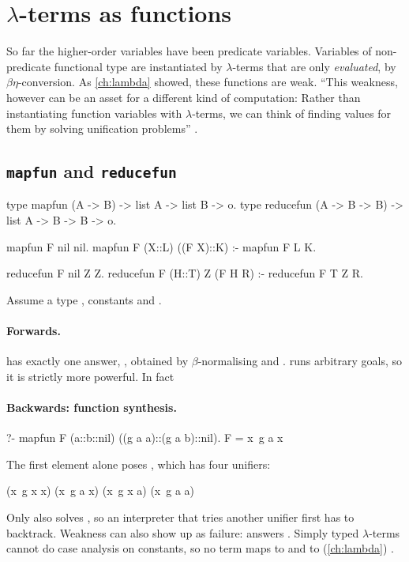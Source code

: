\section{\texorpdfstring{$\lambda$}{Lambda}-terms as functions}\label{sec:hoprog-functions}

So far the higher-order variables have been predicate variables. Variables of non-predicate functional
type are instantiated by $\lambda$-terms that are only \emph{evaluated}, by $\beta\eta$-conversion. As
\cref{ch:lambda} showed, these functions are weak. ``This weakness, however can be an asset for a
different kind of computation: Rather than instantiating function variables with $\lambda$-terms, we can
think of finding values for them by solving unification problems'' .

\subsection{\texttt{mapfun} and \texttt{reducefun}}

\begin{lprolog}
type mapfun     (A -> B) -> list A -> list B -> o.
type reducefun  (A -> B -> B) -> list A -> B -> B -> o.

mapfun F nil nil.
mapfun F (X::L) ((F X)::K) :- mapfun F L K.

reducefun F nil Z Z.
reducefun F (H::T) Z (F H R) :- reducefun F T Z R.
\end{lprolog}
Assume a type , constants  and .

\paragraph{Forwards.}  has exactly one answer,
, obtained by $\beta$-normalising  and
 .  runs arbitrary goals, so it is strictly more powerful. In fact

\paragraph{Backwards: function synthesis.} 
\begin{lprolog}
?- mapfun F (a::b::nil) ((g a a)::(g a b)::nil).
F = x\ g a x                        %
\end{lprolog}
The first element alone poses , which has four unifiers:
\begin{lprolog}
(x\ g x x)   (x\ g a x)   (x\ g x a)   (x\ g a a)
\end{lprolog}
Only  also solves , so an interpreter that tries another unifier first has to
backtrack. Weakness can also show up as failure:  answers
. Simply typed $\lambda$-terms cannot do case analysis on constants, so no term maps
 to  and  to  (\cref{ch:lambda}) .

